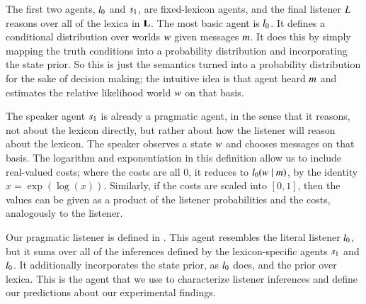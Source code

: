 \documentclass[leqno,12pt]{article}
\begin{document}
The first two agents, $l_{0}$ and $s_{1}$, are
fixed-lexicon agents, and the final listener $L$
reasons over all of the lexica in $\mathbf{L}$.  The most basic agent is
$l_{0}$. It defines a conditional distribution over worlds
$w$ given messages $m$. It does this by simply mapping the
truth conditions into a probability distribution and incorporating the
state prior. So this is just the semantics turned into a probability
distribution for the sake of decision making; the intuitive idea is
that agent heard $m$ and estimates the relative likelihood world
$w$ on that basis.

The speaker agent $s_{1}$ is already a pragmatic agent, in the
sense that it reasons, not about the lexicon directly, but rather
about how the listener will reason about the lexicon. The speaker
observes a state $w$ and chooses messages on that basis. The
logarithm and exponentiation in this definition allow us to include
real-valued costs; where the costs are all $0$, it reduces to
$l_{0}(w \mid m)$, by the identity
$x = \exp(\log(x))$.  Similarly, if the costs are scaled into $[0,1]$,
then the values can be given as a product of the listener
probabilities and the costs, analogously to the listener.

Our pragmatic listener is defined in . This agent
resembles the literal listener $l_{0}$, but it sums over all
of the inferences defined by the lexicon-specific agents $s_{1}$
and $l_{0}$. It additionally incorporates the state prior, as
$l_{0}$ does, and the prior over lexica.  This is the agent
that we use to characterize listener inferences and define our
predictions about our experimental findings.

\end{document}
